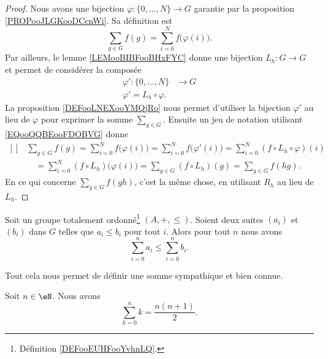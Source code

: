 \begin{proof}
	Nous avons une bijection \( \varphi\colon \{ 0,\ldots,  N \}\to G\) garantie par la proposition \ref{PROPooJLGKooDCcnWi}. Sa définition est
	\begin{equation}
		\sum_{g\in G}f(g)=\sum_{i=0}^Nf\big( \varphi(i) \big).
	\end{equation}
	Par ailleurs, le lemme \ref{LEMooBIBFooBHxFYC} donne une bijection \( L_h\colon G\to G\) et permet de considérer la composée
	\begin{equation}
		\begin{aligned}
			\varphi'\colon \{ 0,\ldots,  N \} & \to G \\
			\varphi'=L_h\circ \varphi.
		\end{aligned}
	\end{equation}
	La proposition \ref{DEFooLNEXooYMQjRo} nous permet d'utiliser la bijection \( \varphi'\) au lieu de \( \varphi\) pour exprimer la somme \( \sum_{g\in G}\). Ensuite un jeu de notation utilisant \eqref{EQooQQBEooFDOBVG} donne
	\begin{equation}
		\begin{aligned}[]
			 & \sum_{g\in G}f(g)=\sum_{i=0}^Nf\big( \varphi(i) \big)=\sum_{i=0}^Nf\big( \varphi'(i) \big)=\sum_{i=0}^N(f\circ L_h\circ \varphi)(i) \\
			 & \quad=\sum_{i=0}^N(f\circ L_h)\big( \varphi(i) \big)=\sum_{g\in G}(f\circ L_h)(g)=\sum_{g\in G}f(hg).
		\end{aligned}
	\end{equation}
	En ce qui concerne \( \sum_{g\in G}f(gh)\), c'est la même chose, en utilisant \( R_h\) au lieu de \( L_h\).
\end{proof}

\begin{lemma}       \label{LEMooKSVWooIFsfwm}
	Soit un groupe totalement ordonné\footnote{Définition \ref{DEFooEUHFooYvhnLQ}.} \( (A,+,\leq)\). Soient deux suites \( (a_i)\) et \( (b_i)\) dans \( G\) telles que \( a_i\leq b_i\) pour tout \( i\). Alors pour tout \( n\) nous avons
	\begin{equation}
		\sum_{i=0}^na_i\leq \sum_{i=0}^nb_i.
	\end{equation}
\end{lemma}

Tout cela nous permet de définir une somme sympathique et bien connue.
\begin{lemma}
	Soit \( n\in \eN\). Nous avons
	\begin{equation}
		\sum_{k=0}^nk=\frac{ n(n+1) }{ 2 }.
	\end{equation}
\end{lemma}

